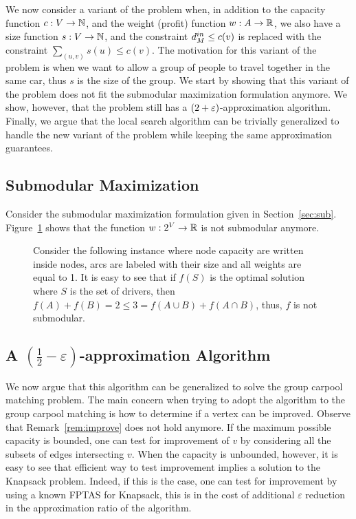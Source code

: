 
We now consider a variant of the problem when, in addition to the
capacity function $c:V \to \N$, and the weight (profit) function
$w:A \to \R$, we also have a size function $s:V \to \N$, and the
constraint $\din[M] \leq c(v)$ is replaced with the constraint
$\sum_{(u,v)}s(u) \leq c(v)$.  The motivation for this variant of
the problem is when we want to allow a group of people to travel
together in the same car, thus $s$ is the size of the group.  We start
by showing that this variant of the problem does not fit the
submodular maximization formulation anymore. We show, however, that
the problem still has a $(2 +\eps)$-approximation algorithm.  Finally,
we argue that the local search algorithm can be trivially generalized
to handle the new variant of the problem while keeping the same
approximation guarantees.


\subsection{Submodular Maximization}

Consider the submodular maximization formulation given in Section~\ref{sec:sub}.
Figure~\ref{fig:not submodular} shows that the function $w : 2^V \to \R$ is not
submodular anymore.

\begin{figure}
\begin{center}

\end{center}
\caption{Consider the following instance where node capacity are
written inside nodes, arcs are labeled with their size and all weights
are equal to 1.  It is easy to see that if $f(S)$ is the optimal
solution where $S$ is the set of drivers, then $f(A) + f(B) = 2 \leq 3
= f(A \cup B) + f(A \cap B)$, thus, $f$ is not submodular.}
\label{fig:not submodular}
\end{figure}



\subsection{A $(\frac{1}{2} - \varepsilon)$-approximation Algorithm}


We now argue that this algorithm can be generalized to solve the group carpool
matching problem.
The main concern when trying to adopt the algorithm to the group carpool
matching is how to determine if a vertex can be improved.
Observe that Remark~\ref{rem:improve} does not hold anymore.
If the maximum possible capacity is bounded, one can test for improvement of
$v$ by considering all the subsets of edges intersecting $v$. 
When the capacity is unbounded, however, it is easy to see that efficient
way to test improvement implies a solution to the Knapsack problem.
Indeed, if this is the case, one can test for improvement by using a known FPTAS
for Knapsack, this is in the cost of additional $\varepsilon$ reduction in the
approximation ratio of the algorithm.



